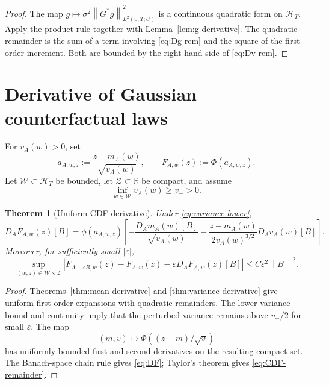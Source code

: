 \documentclass[11pt]{article}
\newtheorem{theorem}[assumption]{Theorem}
\theoremstyle{remark}
\newcommand{\R}{\mathbb R}
\newcommand{\cH}{\mathcal H_T}
\newcommand{\cW}{\mathcal W}
\newcommand{\cZ}{\mathcal Z}
\newcommand{\Ph}{\Phi}
\newcommand{\ph}{\phi}
\newcommand{\norm}[1]{\left\lVert #1\right\rVert}
\newcommand{\abs}[1]{\left\lvert #1\right\rvert}
\begin{document}
\begin{proof}
The map $g\mapsto\sigma^2\norm{G^*g}_{L^2(0,T;U)}^2$ is a continuous quadratic form on $\cH$. Apply the product rule together with Lemma~\ref{lem:g-derivative}. The quadratic remainder is the sum of a term involving \eqref{eq:Dg-rem} and the square of the first-order increment. Both are bounded by the right-hand side of \eqref{eq:Dv-rem}.
\end{proof}

\section{Derivative of Gaussian counterfactual laws}

For $v_A(w)>0$, set
\begin{equation}\label{eq:a-standard}
 a_{A,w,z}
 :=
 \frac{z-m_A(w)}{\sqrt{v_A(w)}},
 \qquad
 F_{A,w}(z):=\Ph(a_{A,w,z}).
\end{equation}
Let $\cW\subset\cH$ be bounded, let $\cZ\subset\R$ be compact, and assume
\begin{equation}\label{eq:variance-lower}
 \inf_{w\in\cW}v_A(w)\ge v_->0.
\end{equation}

\begin{theorem}[Uniform CDF derivative]\label{thm:CDF-derivative}
Under \eqref{eq:variance-lower},
\begin{equation}\label{eq:DF}
 D_AF_{A,w}(z)[B]
 =
 \ph(a_{A,w,z})
 \left[
 -\frac{D_Am_A(w)[B]}{\sqrt{v_A(w)}}
 -\frac{z-m_A(w)}{2v_A(w)^{3/2}}
 D_Av_A(w)[B]
 \right].
\end{equation}
Moreover, for sufficiently small $\abs{\varepsilon}$,
\begin{equation}\label{eq:CDF-remainder}
 \sup_{(w,z)\in\cW\times\cZ}
 \abs{
 F_{A+\varepsilon B,w}(z)-F_{A,w}(z)
 -\varepsilon D_AF_{A,w}(z)[B]
 }
 \le C\varepsilon^2\norm{B}^2.
\end{equation}
\end{theorem}

\begin{proof}
Theorems~\ref{thm:mean-derivative} and \ref{thm:variance-derivative} give uniform first-order expansions with quadratic remainders. The lower variance bound and continuity imply that the perturbed variance remains above $v_-/2$ for small $\varepsilon$. The map
\[
 (m,v)\mapsto\Ph((z-m)/\sqrt v)
\]
has uniformly bounded first and second derivatives on the resulting compact set. The Banach-space chain rule gives \eqref{eq:DF}; Taylor's theorem gives \eqref{eq:CDF-remainder}.
\end{proof}
\end{document}
